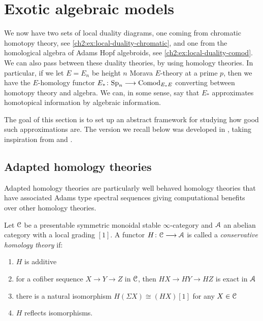 
\section{Exotic algebraic models}
\label{ch2:sec:exotic-algebraic-models}

We now have two sets of local duality diagrams, one coming from chromatic homotopy theory, see \cref{ch2:ex:local-duality-chromatic}, and one from the homological algebra of Adams Hopf algebroids, see \cref{ch2:ex:local-duality-comod}. We can also pass between these duality theories, by using homology theories. In particular, if we let $E=E_n$ be height $n$ Morava $E$-theory at a prime $p$, then we have the $E$-homology functor $E_*\colon \mathrm{Sp}_{n}\longrightarrow \mathrm{Comod}_{E_*E}$ converting between homotopy theory and algebra. We can, in some sense, say that $E_*$ approximates homotopical information by algebraic information. 

The goal of this section is to set up an abstract framework for studying how good such approximations are. The version we recall below was developed in \cite{patchkoria-pstragowski_2021}, taking inspiration from \cite{franke_96} and \cite{pstragowski_2022}. 


\subsection{Adapted homology theories}

Adapted homology theories are particularly well behaved homology theories that have associated Adams type spectral sequences giving computational benefits over other homology theories. 

\begin{definition}
    \label{ch2:def:homology-theory}
    Let $\EuScript{C}$ be a presentable symmetric monoidal stable $\infty$-category and $\EuScript{A}$ an abelian category with a local grading $[1]$. A functor $H\colon \EuScript{C}\longrightarrow \EuScript{A}$ is called a \emph{conservative homology theory} if:
    \begin{enumerate}
        \item $H$ is additive
        \item for a cofiber sequence $X\to Y\to Z$ in $\EuScript{C}$, then $HX\to HY\to HZ$ is exact in $\EuScript{A}$
        \item there is a natural isomorphism $H(\Sigma X)\cong (HX)[1]$ for any $X\in \EuScript{C}$
        \item $H$ reflects isomorphisms. 
    \end{enumerate}
\end{definition}

